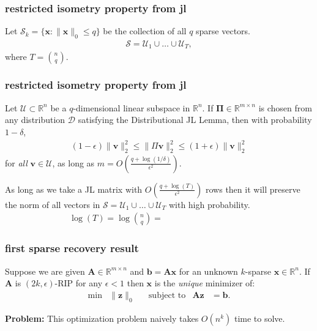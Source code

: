 \documentclass[compress]{beamer}
\newcommand{\bs}[1]{\boldsymbol{#1}}
\newcommand{\bv}[1]{\mathbf{#1}}
\newcommand{\R}{\mathbb{R}}
\begin{document}
	\begin{frame}[t]
		\frametitle{restricted isometry property from jl}
		Let $\mathcal{S}_k = \{\bv{x}: \|\bv{x}\|_0 \leq q\}$ be the collection of all $q$ sparse vectors. 
		\begin{align*}
			\mathcal{S} = \mathcal{U}_1 \cup \ldots \cup \mathcal{U}_T,
		\end{align*}
		where $T = {n \choose q}$. 

	\end{frame}

	\begin{frame}[t]
		\frametitle{restricted isometry property from jl}
		\begin{theorem}
			Let $\mathcal{U} \subset \R^n$ be a $q$-dimensional linear subspace in $\R^n$. If $\bs{\Pi}\in \R^{m\times n}$ is chosen from any distribution $\mathcal{D}$ satisfying the Distributional  JL Lemma, then with probability $1-\delta$,
			\begin{align*}
				(1-\epsilon)\|\bv{v}\|_2^2 \leq \|\Pi \bv{v}\|_2^2 \leq	(1+\epsilon)\|\bv{v}\|_2^2
			\end{align*}
			for \emph{all} $\bv{v} \in \mathcal{U}$, as long as  $m = O\left(\frac{q + \log(1/\delta)}{\epsilon^2}\right)$.
		\end{theorem}
		As long as we take a JL matrix with $O(\frac{q + \log(T)}{\epsilon^2})$ rows then it will preserve the norm of all vectors in $\mathcal{S} = \mathcal{U}_1 \cup \ldots \cup \mathcal{U}_T$ with high probability. 
		\begin{align*}
			\log(T) = \log {n \choose q} = \hspace{10em}
		\end{align*}
	\end{frame}


	\begin{frame}[t]
	\frametitle{first sparse recovery result}
	\begin{theorem}
		Suppose we are given $\bv{A} \in \R^{m\times n}$ and $\bv{b} = \bv{A}\bv{x}$ for an unknown $k$-sparse $\bv{x} \in \R^n$.
		If $\bv{A}$ is $(2k,\epsilon)$-RIP for any $\epsilon < 1$ then $\bv{x}$ is the \emph{unique} minimizer of:
		\begin{align*}
			\min &\|\bv{z}\|_0 & &\text{subject to} & \bv{A}\bv{z} &= \bv{b} .
		\end{align*}
	\end{theorem}
\alert{\textbf{Problem:} This optimization problem naively takes $O(n^k)$ time to solve. }
\end{frame}
	
\end{document}
